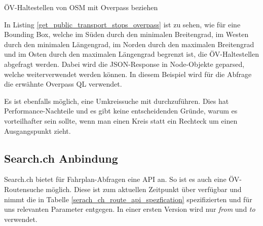 \begin{listing}[ht]
    \inputminted{python}{projectdoc/listing/get_public_transport_stops_overpass.py}
    \caption{ÖV-Haltestellen von \acs{OSM} mit Overpass beziehen}
    \label{get_public_transport_stops_overpass}
\end{listing}

In Listing \ref{get_public_transport_stops_overpass} ist zu sehen, wie für eine Bounding Box, welche im Süden durch den minimalen Breitengrad, im Westen durch den minimalen Längengrad, im Norden durch den maximalen Breitengrad und im Osten durch den maximalen Längengrad begrenzt ist, die ÖV-Haltestellen abgefragt werden. Dabei wird die JSON-Response in Node-Objekte geparsed, welche weiterverwendet werden können. In diesem Beispiel wird für die Abfrage die erwähnte Overpass QL verwendet.

Es ist ebenfalls möglich, eine Umkreissuche mit  durchzuführen. Dies hat Performance-Nachteile und es gibt keine entscheidenden Gründe, warum es vorteilhafter sein sollte, wenn man einen Kreis statt ein Rechteck um einen Ausgangspunkt zieht.

\subsection{Search.ch Anbindung}
\label{analyse:Search.ch Anbindung}
Search.ch bietet für Fahrplan-Abfragen eine API\cite{search_ch_route_api} an. So ist es auch eine ÖV-Routensuche möglich. Diese ist zum aktuellen Zeitpunkt über  verfügbar und nimmt die in Tabelle \ref{serach_ch_route_api_spezfication} spezifizierten und für uns relevanten Parameter entgegen. In einer ersten Version wird nur \emph{from} und \emph{to} verwendet.

